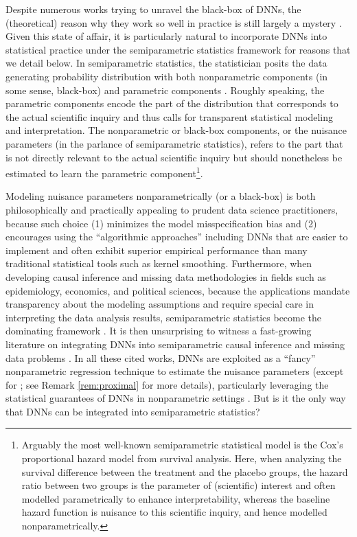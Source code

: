\documentclass[11pt]{article}
\begin{document}
Despite numerous works trying to unravel the black-box of DNNs, the (theoretical) reason why they work so well in practice is still largely a mystery \citep{elad2020another, goel2020superpolynomial}. Given this state of affair, it is particularly natural to incorporate DNNs into statistical practice under the semiparametric statistics framework for reasons that we detail below. In semiparametric statistics, the statistician posits the data generating probability distribution with both nonparametric components (in some sense, black-box) and parametric components \citep{bickel1998efficient}. Roughly speaking, the parametric components encode the part of the distribution that corresponds to the actual scientific inquiry and thus calls for transparent statistical modeling and interpretation. The nonparametric or black-box components, or the nuisance parameters (in the parlance of semiparametric statistics), refers to the part that is not directly relevant to the actual scientific inquiry but should nonetheless be estimated to learn the parametric component\footnote{Arguably the most well-known semiparametric statistical model is the Cox's proportional hazard model from survival analysis. Here, when analyzing the survival difference between the treatment and the placebo groups, the hazard ratio between two groups is the parameter of (scientific) interest and often modelled parametrically to enhance interpretability, whereas the baseline hazard function is nuisance to this scientific inquiry, and hence modelled nonparametrically.}.

Modeling nuisance parameters nonparametrically (or a black-box) is both philosophically and practically appealing to prudent data science practitioners, because such choice (1) minimizes the model misspecification bias and (2) encourages using the ``algorithmic approaches'' including DNNs \citep{breiman2001statistical, kennedy2020discussion} that are easier to implement and often exhibit superior empirical performance than many traditional statistical tools such as kernel smoothing. Furthermore, when developing causal inference and missing data methodologies in fields such as epidemiology, economics, and political sciences, because the applications mandate transparency about the modeling assumptions and require special care in interpreting the data analysis results, semiparametric statistics become the dominating framework \citep{newey1990semiparametric, robins1994estimation, chernozhukov2018double, farrell2021deep}. It is then unsurprising to witness a fast-growing literature on integrating DNNs into semiparametric causal inference and missing data problems \citep{shi2019adapting, farrell2021deep, chen2020causal, xu2022deepmed, kompa2022deep}. In all these cited works, DNNs are exploited as a ``fancy'' nonparametric regression technique to estimate the nuisance parameters (except for \citet{kompa2022deep}; see Remark \ref{rem:proximal} for more details), particularly leveraging the statistical guarantees of DNNs in nonparametric settings \citep{suzuki2019adaptivity, schmidt2020nonparametric, jiao2021deep}. But is it the only way that DNNs can be integrated into semiparametric statistics?
\end{document}
